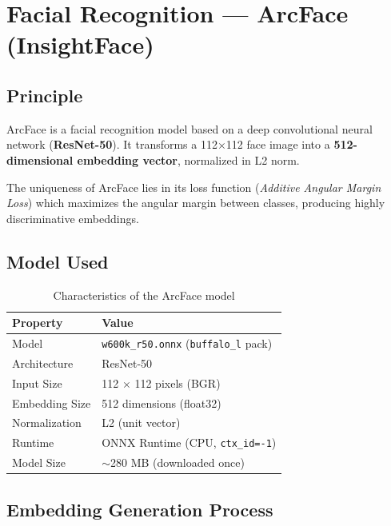 \section{Facial Recognition — ArcFace (InsightFace)}

\subsection{Principle}

ArcFace is a facial recognition model based on a deep convolutional neural network (\textbf{ResNet-50}). It transforms a 112$\times$112 face image into a \textbf{512-dimensional embedding vector}, normalized in L2 norm.

The uniqueness of ArcFace lies in its loss function (\textit{Additive Angular Margin Loss}) which maximizes the angular margin between classes, producing highly discriminative embeddings.

\subsection{Model Used}

\begin{table}[H]
    \centering
    \begin{tabular}{ll}
        \toprule
        \textbf{Property} & \textbf{Value} \\
        \midrule
        Model           & \texttt{w600k\_r50.onnx} (\texttt{buffalo\_l} pack) \\
        Architecture    & ResNet-50 \\
        Input Size      & 112 $\times$ 112 pixels (BGR) \\
        Embedding Size  & 512 dimensions (float32) \\
        Normalization   & L2 (unit vector) \\
        Runtime         & ONNX Runtime (CPU, \texttt{ctx\_id=-1}) \\
        Model Size      & $\sim$280 MB (downloaded once) \\
        \bottomrule
    \end{tabular}
    \caption{Characteristics of the ArcFace model}
\end{table}

\subsection{Embedding Generation Process}


